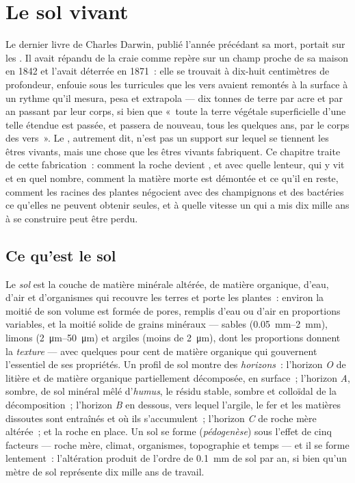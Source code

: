 \chapter{Le sol vivant}\label{ch:b2:living-soil}

Le dernier livre de Charles Darwin, publié l'année précédant sa mort,
portait sur les . Il avait répandu de la craie comme repère
sur un champ proche de sa maison en 1842 et l'avait déterrée en 1871~:
elle se trouvait à dix-huit centimètres de profondeur, enfouie sous les
turricules que les vers avaient remontés à la surface à un rythme qu'il
mesura, pesa et extrapola --- dix tonnes de terre par acre et par an
passant par leur corps, si bien que «~toute la terre végétale
superficielle d'une telle étendue est passée, et passera de nouveau, tous
les quelques ans, par le corps des vers~». Le , autrement dit, n'est
pas un support sur lequel se tiennent les êtres vivants, mais une chose
que les êtres vivants fabriquent. Ce chapitre traite de cette
fabrication~: comment la roche devient , et avec quelle lenteur, qui
y vit et en quel nombre, comment la matière morte est démontée et ce
qu'il en reste, comment les racines des plantes négocient avec des
champignons et des bactéries ce qu'elles ne peuvent obtenir seules, et à
quelle vitesse un  qui a mis dix mille ans à se construire peut être
perdu.

\section{Ce qu'est le sol}

\begin{definition}\label{def:b2:living-soil:soil}
Le \emph{sol} est la couche de matière minérale altérée, de matière
organique, d'eau, d'air et d'organismes qui recouvre les terres et porte
les plantes~: environ la moitié de son volume est formée de pores, remplis
d'eau ou d'air en proportions variables, et la moitié solide de grains
minéraux ---
sables (\qtyrange{0.05}{2}{mm}), limons (\qtyrange{2}{50}{\micro m}) et
argiles (moins de \qty{2}{\micro m}), dont les proportions donnent la
\emph{texture} --- avec quelques pour cent de matière organique qui
gouvernent l'essentiel de ses propriétés. Un profil de sol montre des
\emph{horizons}~: l'horizon \emph{O} de litière et de matière organique
partiellement décomposée, en surface~; l'horizon \emph{A}, sombre, de sol
minéral mêlé d'\emph{humus}, le résidu stable, sombre et colloïdal de la
décomposition~; l'horizon \emph{B} en dessous, vers lequel l'argile, le
fer et les matières dissoutes sont entraînés et où ils s'accumulent~;
l'horizon \emph{C} de roche mère altérée~; et la roche en place. Un sol
se forme (\emph{pédogenèse}) sous l'effet de cinq facteurs --- roche
mère, climat, organismes, topographie et temps --- et il se forme
lentement~: l'altération produit de l'ordre de \qty{0.1}{mm} de sol par
an, si bien qu'un mètre de sol représente dix mille ans de travail.
\end{definition}


